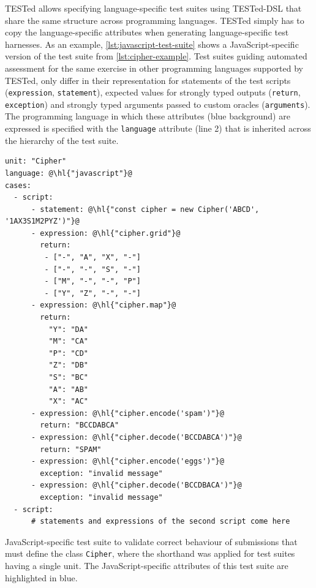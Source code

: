 \documentclass[../main]{subfiles}
\begin{document}
TESTed allows specifying language-specific test suites using TESTed-DSL that share the same structure across programming languages.
TESTed simply has to copy the language-specific attributes when generating language-specific test harnesses.
As an example, \cref{lst:javascript-test-suite} shows a JavaScript-specific version of the test suite from \cref{lst:cipher-example}.
Test suites guiding automated assessment for the same exercise in other programming languages supported by TESTed, only differ in their representation for statements of the test scripts (\texttt{expression}, \texttt{statement}), expected values for strongly typed outputs (\texttt{return}, \texttt{exception}) and strongly typed arguments passed to custom oracles (\texttt{arguments}).
The programming language in which these attributes (blue background) are expressed is specified with the \texttt{language} attribute (line 2) that is inherited across the hierarchy of the test suite.

\begin{listing}
    \begin{verbatim}
unit: "Cipher"
language: @\hl{"javascript"}@
cases:
  - script:
      - statement: @\hl{"const cipher = new Cipher('ABCD', '1AX3S1M2PYZ')"}@
      - expression: @\hl{"cipher.grid"}@
        return:
         - ["-", "A", "X", "-"]
         - ["-", "-", "S", "-"]
         - ["M", "-", "-", "P"]
         - ["Y", "Z", "-", "-"]
      - expression: @\hl{"cipher.map"}@
        return:
          "Y": "DA"
          "M": "CA"
          "P": "CD"
          "Z": "DB"
          "S": "BC"
          "A": "AB"
          "X": "AC"
      - expression: @\hl{"cipher.encode('spam')"}@
        return: "BCCDABCA"
      - expression: @\hl{"cipher.decode('BCCDABCA')"}@
        return: "SPAM"
      - expression: @\hl{"cipher.encode('eggs')"}@
        exception: "invalid message"
      - expression: @\hl{"cipher.decode('BCCDBACA')"}@
        exception: "invalid message"
  - script:
      # statements and expressions of the second script come here
    \end{verbatim}
    \caption[]{
        JavaScript-specific test suite to validate correct behaviour of submissions that must define the class \texttt{Cipher}, where the shorthand was applied for test suites having a single unit.
        The JavaScript-specific attributes of this test suite are highlighted in blue.
    }
    \label{lst:javascript-test-suite}
\end{listing}
\end{document}
